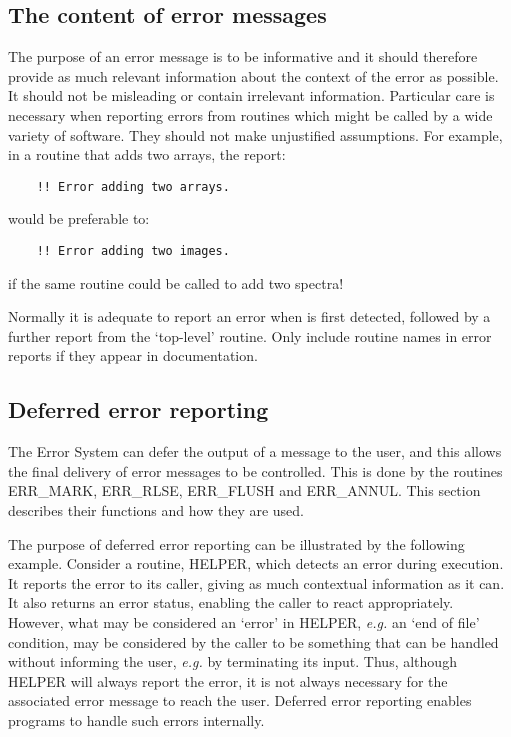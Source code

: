 \subsection{The content of error messages}

The purpose of an error message is to be informative and it should therefore
provide as much relevant information about the context of the error as possible.
It should not be misleading or contain irrelevant information.
Particular care is necessary when reporting errors from routines which might
be called by a wide variety of software.
They should not make unjustified assumptions.
For example, in a routine that adds two arrays, the report:

\begin{small}
\begin{verbatim}
    !! Error adding two arrays.
\end{verbatim}
\end{small}

would be preferable to:

\begin{small}
\begin{verbatim}
    !! Error adding two images.
\end{verbatim}
\end{small}

if the same routine could be called to add two spectra!

Normally it is adequate to report an error when is first detected, followed by
a further report from the `top-level' routine.
Only include routine names in error reports if they appear in documentation.

\subsection {Deferred error reporting}

The Error System can defer the output of a message to the user, and this allows
the final delivery of error messages to be controlled.
This is done by the routines ERR\_MARK, ERR\_RLSE, ERR\_FLUSH and ERR\_ANNUL.
This section describes their functions and how they are used.

The purpose of deferred error reporting can be illustrated by the following
example.
Consider a routine, HELPER, which detects an error during execution.
It reports the error to its caller, giving as much contextual information as
it can.
It also returns an error status, enabling the caller to react appropriately.
However, what may be considered an `error' in HELPER, {\em e.g.} an `end of
file' condition, may be considered by the caller to be something that can be
handled without informing the user, {\em e.g.} by terminating its input.
Thus, although HELPER will always report the error, it is not always necessary
for the associated error message to reach the user.
Deferred error reporting enables programs to handle such errors internally.


